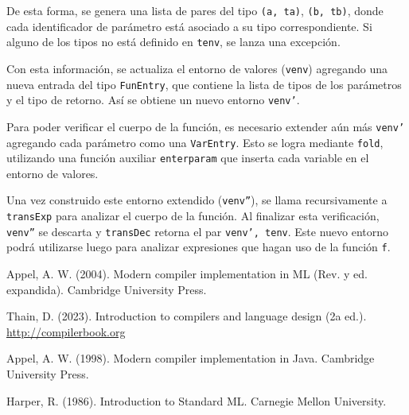 \documentclass[runningheads]{llncs}
\begin{document}
De esta forma, se genera una lista de pares del tipo \texttt{(a, ta)}, \texttt{(b, tb)}, donde cada identificador de parámetro está asociado a su tipo correspondiente. Si alguno de los tipos no está definido en \texttt{tenv}, se lanza una excepción.

Con esta información, se actualiza el entorno de valores (\texttt{venv}) agregando una nueva entrada del tipo \texttt{FunEntry}, que contiene la lista de tipos de los parámetros y el tipo de retorno. Así se obtiene un nuevo entorno \texttt{venv'}.

Para poder verificar el cuerpo de la función, es necesario extender aún más \texttt{venv'} agregando cada parámetro como una \texttt{VarEntry}. Esto se logra mediante \texttt{fold}, utilizando una función auxiliar \texttt{enterparam} que inserta cada variable en el entorno de valores.

Una vez construido este entorno extendido (\texttt{venv''}), se llama recursivamente a \texttt{transExp} para analizar el cuerpo de la función. Al finalizar esta verificación, \texttt{venv''} se descarta y \texttt{transDec} retorna el par \texttt{{venv', tenv}}. Este nuevo entorno podrá utilizarse luego para analizar expresiones que hagan uso de la función \texttt{f}.

\begin{thebibliography}{4}

Appel, A. W. (2004). Modern compiler implementation in ML (Rev. y ed. expandida). Cambridge University Press.

Thain, D. (2023). Introduction to compilers and language design (2a ed.). 
\url{http://compilerbook.org}

Appel, A. W. (1998). Modern compiler implementation in Java. Cambridge University Press.

Harper, R. (1986). Introduction to Standard ML. Carnegie Mellon University.
\end{thebibliography}
\end{document}
